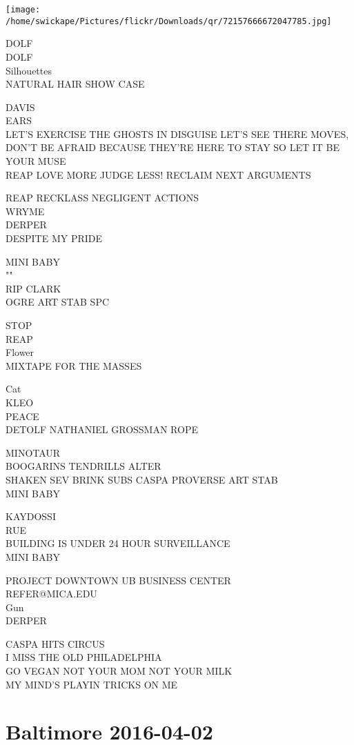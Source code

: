 \documentclass[10pt,letterpaper]{article}
\begin{document}
\texttt{[image: /home/swickape/Pictures/flickr/Downloads/qr/72157666672047785.jpg]}


DOLF\\
DOLF\\
Silhouettes\\
NATURAL HAIR SHOW CASE

DAVIS\\
EARS\\
LET'S EXERCISE THE GHOSTS IN DISGUISE LET'S SEE THERE MOVES, DON'T BE AFRAID BECAUSE THEY'RE HERE TO STAY SO LET IT BE YOUR MUSE\\
REAP LOVE MORE JUDGE LESS! RECLAIM NEXT ARGUMENTS

REAP RECKLASS NEGLIGENT ACTIONS\\
WRYME\\
DERPER\\
DESPITE MY PRIDE

MINI BABY\\
""\\
RIP CLARK\\
OGRE ART STAB SPC

STOP\\
REAP\\
Flower\\
MIXTAPE FOR THE MASSES

Cat\\
KLEO\\
PEACE\\
DETOLF NATHANIEL GROSSMAN ROPE

MINOTAUR\\
BOOGARINS TENDRILLS ALTER\\
SHAKEN SEV BRINK SUBS CASPA PROVERSE ART STAB\\
MINI BABY

KAYDOSSI\\
RUE\\
BUILDING IS UNDER 24 HOUR SURVEILLANCE\\
MINI BABY

PROJECT DOWNTOWN UB BUSINESS CENTER\\
REFER@MICA.EDU\\
Gun\\
DERPER

CASPA HITS CIRCUS\\
I MISS THE OLD PHILADELPHIA\\
GO VEGAN NOT YOUR MOM NOT YOUR MILK\\
MY MIND'S PLAYIN TRICKS ON ME


\section*{Baltimore 2016-04-02}
\end{document}
